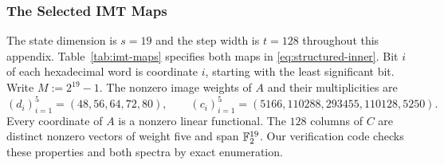 \subsubsection{The Selected IMT Maps}

The state dimension is $s=19$ and the step width is $t=128$ throughout this
appendix. Table~\ref{tab:imt-maps} specifies both maps in
\eqref{eq:structured-inner}. Bit $i$ of each hexadecimal word is coordinate
$i$, starting with the least significant bit. Write $M:=2^{19}-1$.
The nonzero image weights of $A$ and their multiplicities are
\[
 (d_i)_{i=1}^5=(48,56,64,72,80),\qquad
 (c_i)_{i=1}^5=(5166,110288,293455,110128,5250).
\]
Every coordinate of $A$ is a nonzero linear functional. The $128$ columns
of $C$ are distinct nonzero vectors of weight five and span $\mathbb F_2^{19}$.
Our verification code checks these properties and both spectra by exact enumeration.

